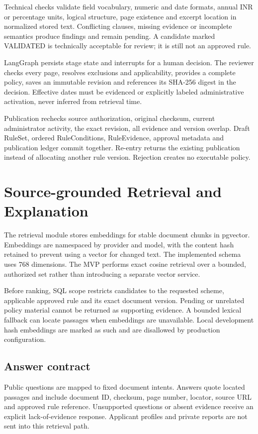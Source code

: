 \documentclass[12pt,a4paper,twoside]{report}
\begin{document}
Technical checks validate field vocabulary, numeric and date formats, annual INR or percentage units, logical structure, page existence and excerpt location in normalized stored text. Conflicting clauses, missing evidence or incomplete semantics produce findings and remain pending. A candidate marked VALIDATED is technically acceptable for review; it is still not an approved rule.

LangGraph persists stage state and interrupts for a human decision. The reviewer checks every page, resolves exclusions and applicability, provides a complete policy, saves an immutable revision and references its SHA-256 digest in the decision. Effective dates must be evidenced or explicitly labeled administrative activation, never inferred from retrieval time.

Publication rechecks source authorization, original checksum, current administrator activity, the exact revision, all evidence and version overlap. Draft RuleSet, ordered RuleConditions, RuleEvidence, approval metadata and publication ledger commit together. Re-entry returns the existing publication instead of allocating another rule version. Rejection creates no executable policy.

\section{Source-grounded Retrieval and Explanation}

The retrieval module stores embeddings for stable document chunks in pgvector. Embeddings are namespaced by provider and model, with the content hash retained to prevent using a vector for changed text. The implemented schema uses 768 dimensions. The MVP performs exact cosine retrieval over a bounded, authorized set rather than introducing a separate vector service.

Before ranking, SQL scope restricts candidates to the requested scheme, applicable approved rule and its exact document version. Pending or unrelated policy material cannot be returned as supporting evidence. A bounded lexical fallback can locate passages when embeddings are unavailable. Local development hash embeddings are marked as such and are disallowed by production configuration.

\subsection*{Answer contract}

Public questions are mapped to fixed document intents. Answers quote located passages and include document ID, checksum, page number, locator, source URL and approved rule reference. Unsupported questions or absent evidence receive an explicit lack-of-evidence response. Applicant profiles and private reports are not sent into this retrieval path.
\end{document}
